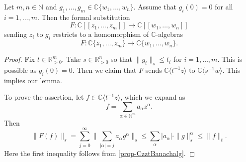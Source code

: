 \begin{lemma}\label{lma-univerpropconvspecialcase}
    Let $m,n\in \mathbb{N}$ and $g_1,\ldots,g_m\in \mathbb{C}\{ w_1,\ldots,w_n\}$. Assume that $g_i(0)=0$ for all $i=1,\ldots,m$. 
    Then the formal substitution 
    \[
        F:\mathbb{C}[[z_1,\ldots,z_m]]\rightarrow \mathbb{C}[[w_1,\ldots,w_n]]
    \]
    sending $z_i$ to $g_i$ restricts to a homomorphism of $\mathbb{C}$-algebras
    \[
        F:  \mathbb{C}\{ z_1,\ldots,z_m\}\rightarrow  \mathbb{C}\{ w_1,\ldots,w_n\}.
    \]
\end{lemma}
\begin{proof}
    Fix $t\in \mathbb{R}^m_{>0}$. Take $s\in \mathbb{R}^n_{>0}$ so that $\|g_i\|_s\leq t_i$ for $i=1,\ldots,m$. This is possible as $g_i(0)=0$.
    Then we claim that $F$ sends $\mathbb{C}\langle t^{-1}z \rangle$ to $\mathbb{C}\langle s^{-1}w\rangle$. This implies our lemma.

    To prove the assertion, let $f\in \mathbb{C}\langle t^{-1}z\rangle$, which we expand as
    \[
        f=\sum_{\alpha\in \mathbb{N}^m} a_{\alpha}z^{\alpha}.
    \]
    Then
    \[
        \|F(f)\|_s=\sum_{j=0}^{\infty}\|\sum_{|\alpha|=j}a_{\alpha}g^{\alpha}\|_s\leq \sum_{\alpha}|a_{\alpha}|\cdot \|g\|_s^{\alpha}\leq \|f\|_t.
    \]
    Here the first inequality follows from \cref{prop-CzztBanachalg}.
\end{proof}

